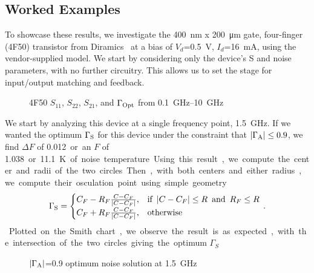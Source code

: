 \subsection{Worked Examples}
To showcase these results, we investigate the \qty{400}{\nm} x \qty{200}{\um} gate, four-finger (4F50) transistor from Diramics~\cite{DiramicsPH2004F50} at a bias of $V_d$=\qty{0.5}{\V}, $I_d$=\qty{16}{\mA}, using the vendor-supplied model.
We start by considering only the device's S and noise parameters, with no further circuitry.
This allows us to set the stage for input/output matching and feedback.

\begin{figure}[ht!]%
    \centering
    \subfloat{}%
    \quad%
    \subfloat{}%
    \caption{{4F50 $S_{11}$, $S_{22}$, $S_{21}$, and $\Gamma_{\text{Opt}}$ from \SIrange{0.1}{10}{\GHz}}}%
    \label{fig:4f50_s_gopt}%
\end{figure}

We start by analyzing this device at a single frequency point, \qty{1.5}{\GHz}.
If we wanted the optimum $\Gamma_{\text{S}}$ for this device under the constraint that $|\Gamma_{\text{A}}| \leq 0.9$, we find $\Delta F$ of \qty{0.012} or an $F$ of \qty{1.038} or \qty{11.1}{\K} of noise temperature.
Using this result, we compute the center and radii of the two circles.
Then, with both centers and either radius, we compute their osculation point using simple geometry
%
\begin{equation}
    \Gamma_{\text{S}} =  
    \begin{cases}
        C_F - R_F\frac{C-C_F}{|C-C_F|},& \text{if\enspace}|C-C_F|\leq R \text{\enspace and\enspace} R_F\leq R\\
        C_F + R_F\frac{C-C_F}{|C-C_F|},              & \text{otherwise}
    \end{cases}\,.
\end{equation}
%

Plotted on the Smith chart, we observe the result is as expected, with the intersection of the two circles giving the optimum $\Gamma_S$
\begin{figure}[ht!]
    \centering
    
    \caption{$|\Gamma_{\text{A}}|$=0.9 optimum noise solution at \qty{1.5}{\GHz}}
    \label{fig:mga_opt}
\end{figure}


